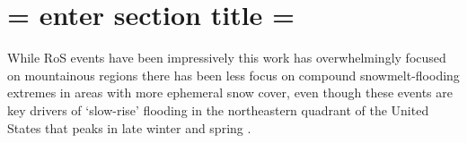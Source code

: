 \documentclass[draft]{agujournal2019}
\begin{document}
%
%

%


%
%
%
%


\section{= enter section title =}


While RoS events have been impressively this work has overwhelmingly focused on mountainous regions \citep{singh1997hydrological,mccabe2007rain,musselman2018projected} there has been less focus on compound snowmelt-flooding extremes in areas with more ephemeral snow cover, even though these events are key drivers of `slow-rise' flooding in the northeastern quadrant of the United States that peaks in late winter and spring \citep{ashley2008flood,villarini2010flood,dougherty2019climatology}.
\end{document}
